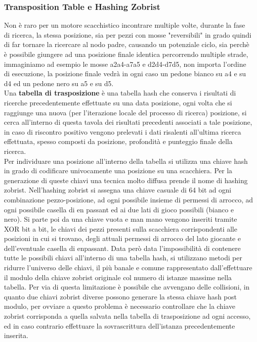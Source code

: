 \subsubsection{Transposition Table e Hashing Zobrist}
Non è raro per un motore scacchistico incontrare multiple volte, durante la fase di ricerca, la stessa posizione, sia per pezzi con mosse "reversibili" in grado quindi di far tornare la ricercare al nodo padre,
causando un potenziale ciclo, sia perchè è possibile giungere ad una posizione finale identica percorrendo multiple strade, immaginiamo ad esempio le mosse a2a4-a7a5 e d2d4-d7d5, non importa l'ordine di esecuzione,
la posizione finale vedrà in ogni caso un pedone bianco su a4 e su d4 ed un pedone nero su a5 e su d5.
\\ Una \textbf{tabella di trasposizione} è una tabella hash che conserva i risultati di ricerche precedentemente effettuate
su una data posizione, ogni volta che si raggiunge una nuova (per l'iterazione locale del processo di ricerca) posizione, si cerca all'interno di questa tavola dei risultati precedenti associati a tale posizione, in caso di riscontro positivo
vengono prelevati i dati risalenti all'ultima ricerca effettuata, spesso composti da posizione, profondità e punteggio finale della ricerca.
\\Per individuare una posizione all'interno della tabella si utilizza una chiave hash in grado di codificare univocamente una posizione su una scacchiera. Per la generazione di queste chiavi una tecnica molto diffusa prende il nome di hashing zobrist. 
Nell'hashing zobrist si assegna una chiave casuale di 64 bit ad ogni combinazione pezzo-posizione, ad ogni possibile insieme di permessi di arrocco, ad ogni possibile casella di en passant ed ai due lati di gioco possibili (bianco e nero).
Si parte poi da una chiave vuota e man mano vengono inseriti tramite XOR bit a bit, le chiavi dei pezzi presenti sulla scacchiera corrispondenti alle posizioni in cui si trovano, degli attuali permessi di arrocco
del lato giocante e dell'eventuale casella di enpassant. Data però data l'impossibilità di contenere tutte le possibili chiavi all'interno di una tabella hash, si utilizzano metodi per ridurre l'universo delle chiavi,
il più banale e comune rappresentato dall'effettuare il modulo della chiave zobrist originale col numero di istanze massime nella tabella. Per via di questa limitazione è possibile che avvengano delle collisioni,
in quanto due chiavi zobrist diverse possono generare la stessa chiave hash post modulo, per ovviare a questo problema è necessario controllare che la chiave zobrist corrisponda a quella salvata nella tabella di 
trasposizione ad ogni accesso, ed in caso contrario effettuare la sovrascrittura dell'istanza precedentemente inserita.




